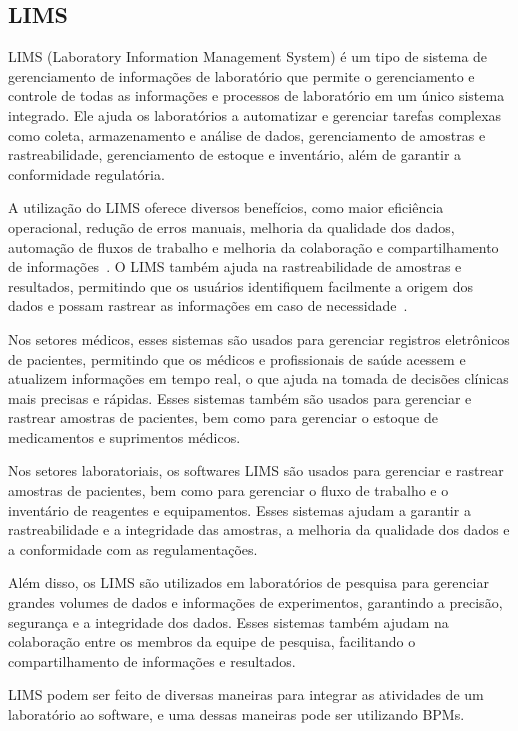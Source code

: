 \subsection{LIMS}


LIMS (Laboratory Information Management System) é um tipo de sistema de gerenciamento de informações de laboratório que permite o gerenciamento e controle de todas as informações e processos de laboratório em um único sistema integrado. Ele ajuda os laboratórios a automatizar e gerenciar tarefas complexas como coleta, armazenamento e análise de dados, gerenciamento de amostras e rastreabilidade, gerenciamento de estoque e inventário, além de garantir a conformidade regulatória.


A utilização do LIMS oferece diversos benefícios, como maior eficiência operacional, redução de erros manuais, melhoria da qualidade dos dados, automação de fluxos de trabalho e melhoria da colaboração e compartilhamento de informações~\cite{Key2011LIMS:Systems}. O LIMS também ajuda na rastreabilidade de amostras e resultados, permitindo que os usuários identifiquem facilmente a origem dos dados e possam rastrear as informações em caso de necessidade~\cite{Cagnd2004ImportanceFactories}.


Nos setores médicos, esses sistemas são usados para gerenciar registros eletrônicos de pacientes, permitindo que os médicos e profissionais de saúde acessem e atualizem informações em tempo real, o que ajuda na tomada de decisões clínicas mais precisas e rápidas. Esses sistemas também são usados para gerenciar e rastrear amostras de pacientes, bem como para gerenciar o estoque de medicamentos e suprimentos médicos.

Nos setores laboratoriais, os softwares LIMS são usados para gerenciar e rastrear amostras de pacientes, bem como para gerenciar o fluxo de trabalho e o inventário de reagentes e equipamentos. Esses sistemas ajudam a garantir a rastreabilidade e a integridade das amostras, a melhoria da qualidade dos dados e a conformidade com as regulamentações.

Além disso, os LIMS são utilizados em laboratórios de pesquisa para gerenciar grandes volumes de dados e informações de experimentos, garantindo a precisão, segurança e a integridade dos dados. Esses sistemas também ajudam na colaboração entre os membros da equipe de pesquisa, facilitando o compartilhamento de informações e resultados.

LIMS podem ser feito de diversas maneiras para integrar as atividades de um laboratório ao software, e uma dessas maneiras pode ser utilizando BPMs.


